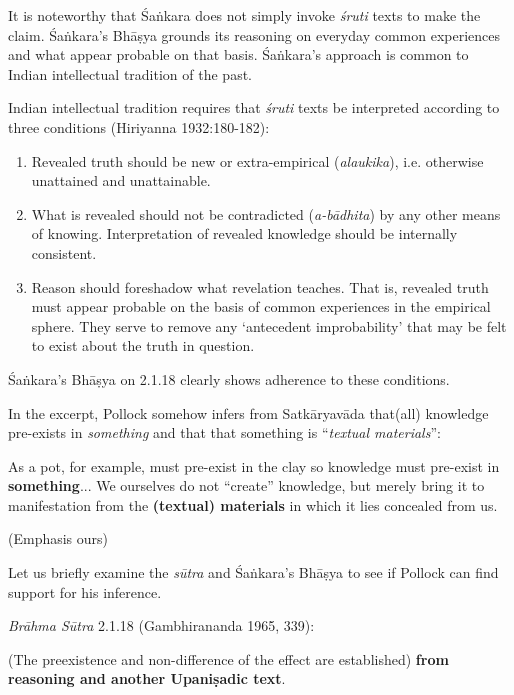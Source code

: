 It is noteworthy that Śaṅkara does not simply invoke {\sl śruti} texts to make the claim.  Śaṅkara's Bhāṣya grounds its reasoning on everyday common experiences and what appear probable on that basis.  Śaṅkara's approach is common to Indian intellectual tradition of the past.

Indian intellectual tradition requires that {\sl śruti} texts be interpreted according to three conditions (Hiriyanna 1932:180-182):
\begin{enumerate}
\item Revealed truth should be new or extra-empirical ({\sl alaukika}), i.e. otherwise unattained and unattainable.

\item What is revealed should not be contradicted ({\sl a-bādhita}) by any other means of knowing. Interpretation of revealed knowledge should be internally consistent.


\item Reason should foreshadow what revelation teaches. That is, revealed truth must appear probable on the basis of common experiences in the empirical sphere. They serve to remove any `antecedent improbability' that may be felt to exist about the truth in question.
\end{enumerate}

Śaṅkara's Bhāṣya on 2.1.18 clearly shows adherence to these conditions.

In the excerpt, Pollock somehow infers from Satkāryavāda that(all) knowledge pre-exists in {\sl something} and that that something is ``{\sl textual materials}'':
\begin{myquote}
As a pot, for example, must pre-exist in the clay so knowledge must pre-exist in {\bf something}... We ourselves do not ``create'' knowledge, but merely bring it to manifestation from the {\bf (textual) materials} in which it lies concealed from us. 

\hfill (Emphasis ours)
\end{myquote}

Let us briefly examine the {\sl sūtra} and Śaṅkara's Bhāṣya to see if Pollock can find support for his inference.

{\sl Brāhma Sūtra} 2.1.18 (Gambhirananda 1965, 339):
\begin{myquote}
(The preexistence and non-difference of the effect are established) \textbf{from reasoning and another Upaniṣadic text}.
\end{myquote}


